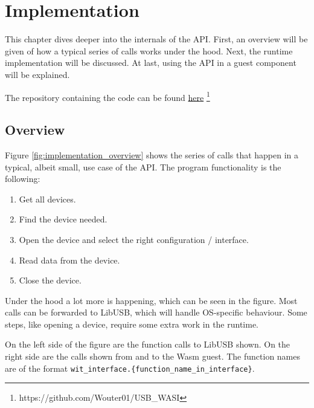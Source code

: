 \chapter{Implementation}
\label{chapter:implementation}
This chapter dives deeper into the internals of the API. First, an overview will be given of how a typical series of calls works under the hood. Next, the runtime implementation will be discussed. At last, using the \acrshort{API} in a guest component will be explained.

The repository containing the code can be found \href{https://github.com/Wouter01/USB_WASI}{here} \footnote{https://github.com/Wouter01/USB\_WASI}

\section{Overview}

Figure \ref{fig:implementation_overview} shows the series of calls that happen in a typical, albeit small, use case of the API. The program functionality is the following:
\begin{enumerate}
\item Get all devices.
\item Find the device needed.
\item Open the device and select the right configuration / interface.
\item Read data from the device.
\item Close the device.
\end{enumerate}

Under the hood a lot more is happening, which can be seen in the figure. Most calls can be forwarded to LibUSB, which will handle OS-specific behaviour. Some steps, like opening a device, require some extra work in the runtime.

On the left side of the figure are the function calls to LibUSB shown. On the right side are the calls shown from and to the \acrshort{Wasm} guest. The function names are of the format \texttt{wit\_interface.\{function\_name\_in\_interface\}}.

